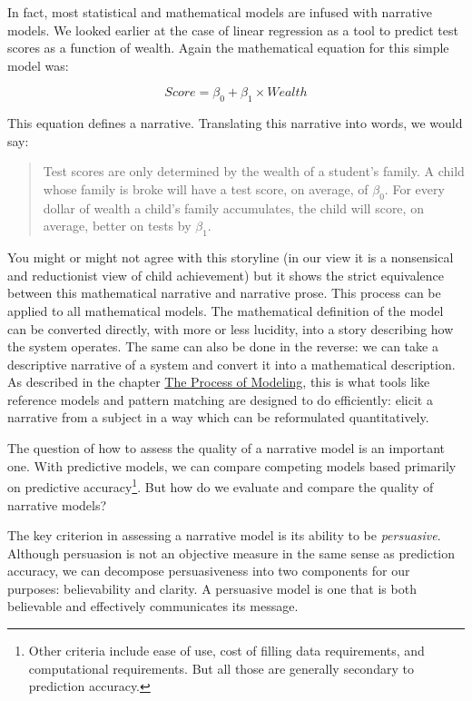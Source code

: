 \documentclass[]{memoir}
\begin{document}
In fact, most statistical and mathematical models are infused with
narrative models. We looked earlier at the case of linear regression as
a tool to predict test scores as a function of wealth. Again the
mathematical equation for this simple model was:

\[ Score = \beta_0 + \beta_1 \times Wealth \]

This equation defines a narrative. Translating this narrative into
words, we would say:

\begin{quote}
Test scores are only determined by the wealth of a student's family. A
child whose family is broke will have a test score, on average, of
$\beta_0$. For every dollar of wealth a child's family accumulates, the
child will score, on average, better on tests by $\beta_1$.
\end{quote}

You might or might not agree with this storyline (in our view it is a
nonsensical and reductionist view of child achievement) but it shows the
strict equivalence between this mathematical narrative and narrative
prose. This process can be applied to all mathematical models. The
mathematical definition of the model can be converted directly, with
more or less lucidity, into a story describing how the system operates.
The same can also be done in the reverse: we can take a descriptive
narrative of a system and convert it into a mathematical description. As
described in the chapter \hyperref[ModelingProcess]{The Process of
Modeling}, this is what tools like reference models and pattern matching
are designed to do efficiently: elicit a narrative from a subject in a
way which can be reformulated quantitatively.

The question of how to assess the quality of a narrative model is an
important one. With predictive models, we can compare competing models
based primarily on predictive accuracy\footnote{Other criteria include
  ease of use, cost of filling data requirements, and computational
  requirements. But all those are generally secondary to prediction
  accuracy.}. But how do we evaluate and compare the quality of
narrative models?

The key criterion in assessing a narrative model is its ability to be
\emph{persuasive}. Although persuasion is not an objective measure in
the same sense as prediction accuracy, we can decompose persuasiveness
into two components for our purposes: believability and clarity. A
persuasive model is one that is both believable and effectively
communicates its message.
\end{document}
